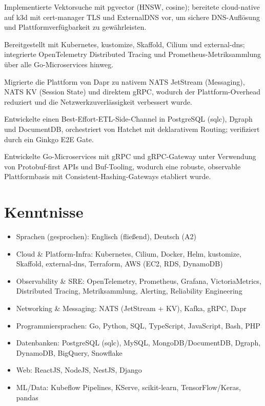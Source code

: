 \documentclass[11pt,a4paper]{resume}
\begin{document}
  \item Implementierte Vektorsuche mit pgvector (HNSW, cosine); bereitete cloud-native auf k3d mit cert-manager TLS und ExternalDNS vor, um sichere DNS-Auflösung und Plattformverfügbarkeit zu gewährleisten.
\bulletsend
\vspace{2pt}
\bullets
  \item Bereitgestellt mit Kubernetes, kustomize, Skaffold, Cilium und external-dns; integrierte OpenTelemetry Distributed Tracing und Prometheus-Metriksammlung über alle Go-Microservices hinweg.
  \item Migrierte die Plattform von Dapr zu nativem NATS JetStream (Messaging), NATS KV (Session State) und direktem gRPC, wodurch der Plattform-Overhead reduziert und die Netzwerkzuverlässigkeit verbessert wurde.
  \item Entwickelte einen Best-Effort-ETL-Side-Channel in PostgreSQL (sqlc), Dgraph und DocumentDB, orchestriert von Hatchet mit deklarativem Routing; verifiziert durch ein Ginkgo E2E Gate.
  \item Entwickelte Go-Microservices mit gRPC und gRPC-Gateway unter Verwendung von Protobuf-first APIs und Buf-Tooling, wodurch eine robuste, observable Plattformbasis mit Consistent-Hashing-Gateways etabliert wurde.
\bulletsend

\section{Kenntnisse}

\begin{itemize}[leftmargin=1.4em,nosep,topsep=2pt]
  \item Sprachen (gesprochen): Englisch (fließend), Deutsch (A2)
  \item Cloud \& Platform-Infra: Kubernetes, Cilium, Docker, Helm, kustomize, Skaffold, external-dns, Terraform, AWS (EC2, RDS, DynamoDB)
  \item Observability \& SRE: OpenTelemetry, Prometheus, Grafana, VictoriaMetrics, Distributed Tracing, Metriksammlung, Alerting, Reliability Engineering
  \item Networking \& Messaging: NATS (JetStream + KV), Kafka, gRPC, Dapr
  \item Programmiersprachen: Go, Python, SQL, TypeScript, JavaScript, Bash, PHP
  \item Datenbanken: PostgreSQL (sqlc), MySQL, MongoDB/DocumentDB, Dgraph, DynamoDB, BigQuery, Snowflake
  \item Web: ReactJS, NodeJS, NestJS, Django
  \item ML/Data: Kubeflow Pipelines, KServe, scikit-learn, TensorFlow/Keras, pandas
\end{itemize}
\end{document}
